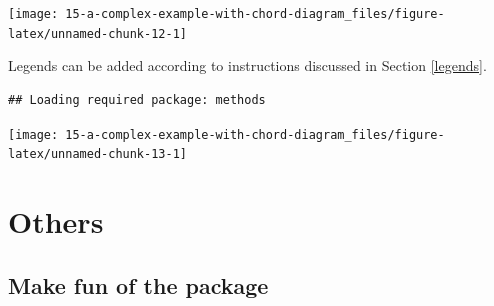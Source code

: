 \documentclass[]{book}
\newenvironment{Shaded}{\begin{snugshade}}{\end{snugshade}}
\newcommand{\KeywordTok}[1]{\textcolor[rgb]{0.13,0.29,0.53}{\textbf{#1}}}
\newcommand{\DataTypeTok}[1]{\textcolor[rgb]{0.13,0.29,0.53}{#1}}
\newcommand{\DecValTok}[1]{\textcolor[rgb]{0.00,0.00,0.81}{#1}}
\newcommand{\FloatTok}[1]{\textcolor[rgb]{0.00,0.00,0.81}{#1}}
\newcommand{\StringTok}[1]{\textcolor[rgb]{0.31,0.60,0.02}{#1}}
\newcommand{\OperatorTok}[1]{\textcolor[rgb]{0.81,0.36,0.00}{\textbf{#1}}}
\newcommand{\NormalTok}[1]{#1}
\theoremstyle{definition}
\theoremstyle{definition}
\theoremstyle{remark}
\begin{document}
\begin{Shaded}
\end{Shaded}

\begin{center}\texttt{[image: 15-a-complex-example-with-chord-diagram\_files/figure-latex/unnamed-chunk-12-1]} \end{center}

Legends can be added according to instructions discussed in Section
\ref{legends}.

\begin{verbatim}
## Loading required package: methods
\end{verbatim}

\begin{center}\texttt{[image: 15-a-complex-example-with-chord-diagram\_files/figure-latex/unnamed-chunk-13-1]} \end{center}

\part{Others}\label{part-others}

\chapter{Make fun of the package}\label{make-fun-of-the-package}
\end{document}
